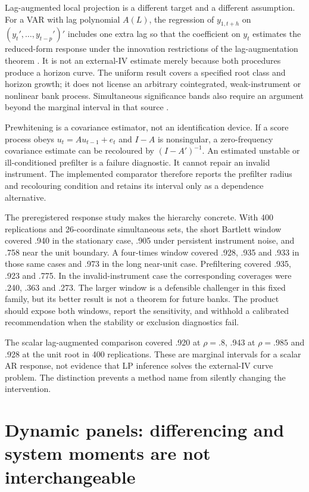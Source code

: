 Lag-augmented local projection is a different target and a different
assumption. For a VAR with lag polynomial $A(L)$, the regression of
$y_{1,t+h}$ on $(y_t',\ldots,y_{t-p}')'$ includes one extra lag so that the
coefficient on $y_t$ estimates the reduced-form response under the
innovation restrictions of the lag-augmentation theorem
\citep{lpaug2020}. It is not an external-IV estimate merely because both
procedures produce a horizon curve. The uniform result covers a specified
root class and horizon growth; it does not license an arbitrary cointegrated,
weak-instrument or nonlinear bank process. Simultaneous significance bands
also require an argument beyond the marginal interval in that source
\citep{inoue2023}.

Prewhitening is a covariance estimator, not an identification device. If a
score process obeys $u_t=A u_{t-1}+e_t$ and $I-A$ is nonsingular, a zero-frequency
covariance estimate can be recoloured by $(I-A')^{-1}$. An estimated unstable
or ill-conditioned prefilter is a failure diagnostic. It cannot repair an
invalid instrument. The implemented comparator therefore reports the
prefilter radius and recolouring condition and retains its interval only as a
dependence alternative.

The preregistered response study makes the hierarchy concrete. With 400
replications and 26-coordinate simultaneous sets, the short Bartlett window
covered .940 in the stationary case, .905 under persistent instrument noise,
and .758 near the unit boundary. A four-times window covered .928, .935 and
.933 in those same cases and .973 in the long near-unit case. Prefiltering
covered .935, .923 and .775. In the invalid-instrument case the corresponding
coverages were .240, .363 and .273. The larger window is a defensible
challenger in this fixed family, but its better result is not a theorem for
future banks. The product should expose both windows, report the sensitivity,
and withhold a calibrated recommendation when the stability or exclusion
diagnostics fail.

The scalar lag-augmented comparison covered .920 at $\rho=.8$, .943 at
$\rho=.985$ and .928 at the unit root in 400 replications. These are marginal
intervals for a scalar AR response, not evidence that LP inference solves the
external-IV curve problem. The distinction prevents a method name from
silently changing the intervention.

\section{Dynamic panels: differencing and system moments are not interchangeable}
\label{s5:dynamic-panel}

